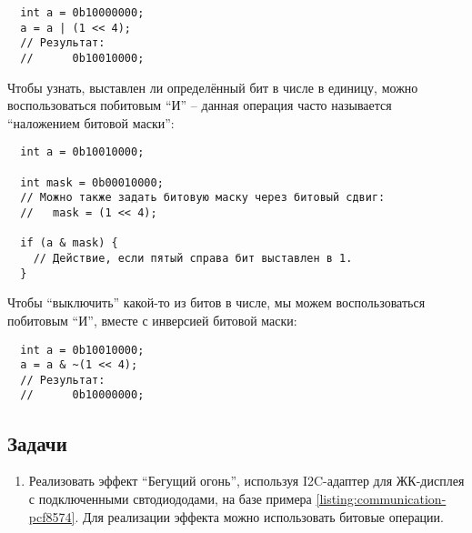 \documentclass[../sparc.tex]{subfiles}
\begin{document}
\begin{verbatim}
  int a = 0b10000000;
  a = a | (1 << 4);
  // Результат:
  //      0b10010000;
\end{verbatim}

Чтобы узнать, выставлен ли определённый бит в числе в единицу, можно
воспользоваться побитовым ``И'' -- данная операция часто называется ``наложением
битовой маски'':

\begin{verbatim}
  int a = 0b10010000;

  int mask = 0b00010000;
  // Можно также задать битовую маску через битовый сдвиг:
  //   mask = (1 << 4);

  if (a & mask) {
    // Действие, если пятый справа бит выставлен в 1.
  }
\end{verbatim}

Чтобы ``выключить'' какой-то из битов в числе, мы можем воспользоваться
побитовым ``И'', вместе с инверсией битовой маски:

\begin{verbatim}
  int a = 0b10010000;
  a = a & ~(1 << 4);
  // Результат:
  //      0b10000000;
\end{verbatim}

\subsection{Задачи}

\begin{enumerate}
\item Реализовать эффект ``Бегущий огонь'', используя I2C-адаптер для ЖК-дисплея
  с подключенными свтодиододами, на базе примера
  \ref{listing:communication-pcf8574}.  Для реализации эффекта можно
  использовать битовые операции.
\end{enumerate}
\end{document}
